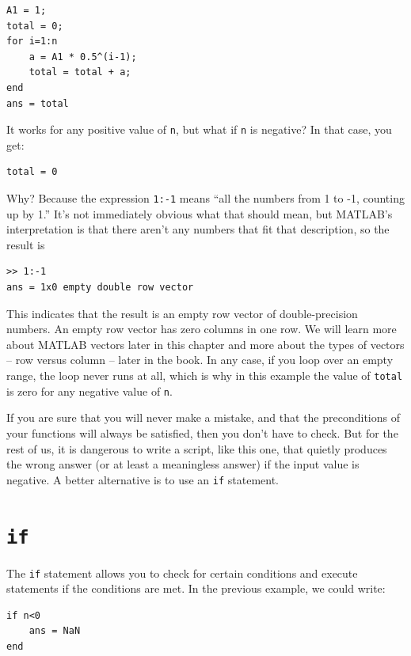 \documentclass[
]{book}
\begin{document}
\begin{verbatim}
A1 = 1;
total = 0;
for i=1:n
    a = A1 * 0.5^(i-1);
    total = total + a;
end
ans = total
\end{verbatim}

It works for any positive value of {\tt n}, but what if {\tt n}
is negative?  In that case, you get:

\begin{verbatim}
total = 0
\end{verbatim}

Why?  Because the expression {\tt 1:-1} means ``all the numbers
from 1 to -1, counting up by 1.''  
It's not immediately obvious
what that should mean, but MATLAB's interpretation is that there
aren't any numbers that fit that description, so the result is

\begin{verbatim}
>> 1:-1
ans = 1x0 empty double row vector
\end{verbatim}

This indicates that the result is an empty row vector of 
double-precision numbers.  An empty row vector has zero columns 
in one row.  We will learn more about MATLAB vectors later in this
chapter and more about the types of vectors -- row versus column --
later in the book.
In any case, if you loop over an empty range,
the loop never runs at all, which is why in this example the
value of {\tt total} is zero for any negative value of {\tt n}.

If you are sure that you will never make a mistake, and that the
preconditions of your functions will always be satisfied, then you
don't have to check.  But for the rest of us, it is dangerous to write
a script, like this one, that quietly produces the wrong answer (or
at least a meaningless answer) if the input value is negative.
A better alternative is to use an {\tt if} statement.


\section{{\tt if}}

The {\tt if} statement allows you to check for certain conditions
and execute statements if the conditions are met.  In the previous
example, we could write:

\begin{verbatim}
if n<0
    ans = NaN
end
\end{verbatim}
\end{document}
